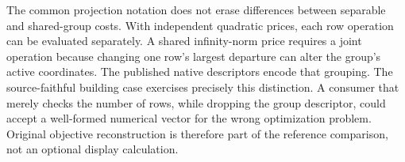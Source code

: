 The common projection notation does not erase differences between separable
and shared-group costs. With independent quadratic prices, each row operation
can be evaluated separately. A shared infinity-norm price requires a joint
operation because changing one row's largest departure can alter the group's
active coordinates. The published native descriptors encode that grouping.
The source-faithful building case exercises precisely this distinction. A
consumer that merely checks the number of rows, while dropping the group
descriptor, could accept a well-formed numerical vector for the wrong
optimization problem. Original objective reconstruction is therefore part
of the reference comparison, not an optional display calculation.
